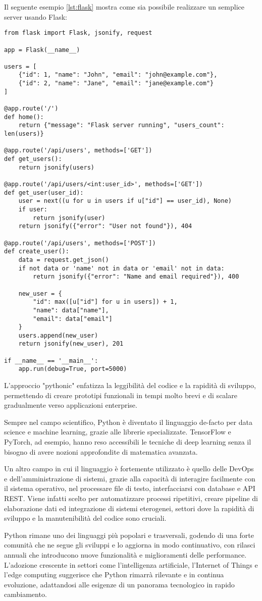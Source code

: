 Il seguente esempio \ref{lst:flask} mostra come sia possibile realizzare un semplice server usando Flask:

\begin{lstlisting}[caption={Server Flask base in Python}, label=lst:flask]
from flask import Flask, jsonify, request

app = Flask(__name__)

users = [
    {"id": 1, "name": "John", "email": "john@example.com"},
    {"id": 2, "name": "Jane", "email": "jane@example.com"}
]

@app.route('/')
def home():
    return {"message": "Flask server running", "users_count": len(users)}

@app.route('/api/users', methods=['GET'])
def get_users():
    return jsonify(users)

@app.route('/api/users/<int:user_id>', methods=['GET'])
def get_user(user_id):
    user = next((u for u in users if u["id"] == user_id), None)
    if user:
        return jsonify(user)
    return jsonify({"error": "User not found"}), 404

@app.route('/api/users', methods=['POST'])
def create_user():
    data = request.get_json()
    if not data or 'name' not in data or 'email' not in data:
        return jsonify({"error": "Name and email required"}), 400

    new_user = {
        "id": max([u["id"] for u in users]) + 1,
        "name": data["name"],
        "email": data["email"]
    }
    users.append(new_user)
    return jsonify(new_user), 201

if __name__ == '__main__':
    app.run(debug=True, port=5000)
\end{lstlisting}

L'approccio "pythonic" enfatizza la leggibilità del codice e la rapidità di sviluppo, permettendo di creare prototipi funzionali in tempi molto brevi e di scalare gradualmente verso applicazioni enterprise.

Sempre nel campo scientifico, Python è diventato il linguaggio de-facto per data science e machine learning, grazie alle librerie specializzate. TensorFlow e PyTorch, ad esempio, hanno reso accessibili le tecniche di deep learning senza il bisogno di avere nozioni approfondite di matematica avanzata.

Un altro campo in cui il linguaggio è fortemente utilizzato è quello delle DevOps e dell'amministrazione di sistemi, grazie alla capacità di interagire facilmente con il sistema operativo, nel processare file di testo, interfacciarsi con database e API REST. Viene infatti scelto per automatizzare processi ripetitivi, creare pipeline di elaborazione dati ed integrazione di sistemi eterogenei, settori dove la rapidità di sviluppo e la manutenibilità del codice sono cruciali.

Python rimane uno dei linguaggi più popolari e trasversali, godendo di una forte comunità che ne segue gli sviluppi e lo aggiorna in modo continuativo, con rilasci annuali che introducono nuove funzionalità e miglioramenti delle performance. L'adozione crescente in settori come l'intelligenza artificiale, l'Internet of Things e l'edge computing suggerisce che Python rimarrà rilevante e in continua evoluzione, adattandosi alle esigenze di un panorama tecnologico in rapido cambiamento.
